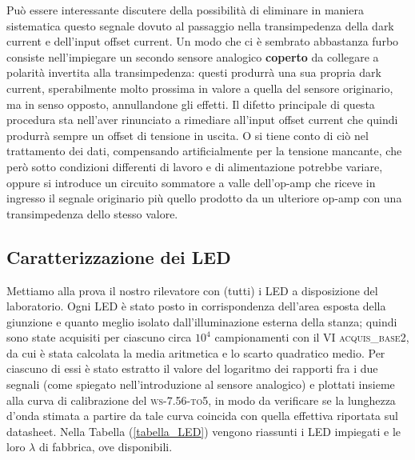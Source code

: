 \documentclass[10pt,letterpaper]{article}
\begin{document}
Può essere interessante discutere della possibilità di eliminare in maniera sistematica questo segnale dovuto al passaggio nella transimpedenza della dark current e dell'input offset current. Un modo che ci è sembrato abbastanza furbo consiste nell'impiegare un secondo sensore analogico \textbf{coperto} da collegare a polarità invertita alla transimpedenza: questi produrrà una sua propria dark current, sperabilmente molto prossima in valore a quella del sensore originario, ma in senso opposto, annullandone gli effetti. Il difetto principale di questa procedura sta nell'aver rinunciato a rimediare all'input offset current che quindi produrrà sempre un offset di tensione in uscita. O si tiene conto di ciò nel trattamento dei dati, compensando artificialmente per la tensione mancante, che però sotto condizioni differenti di lavoro e di alimentazione potrebbe variare, oppure si introduce un circuito sommatore a valle dell'op-amp che riceve in ingresso il segnale originario più quello prodotto da un ulteriore op-amp con una transimpedenza dello stesso valore.\\ 

\subsection{Caratterizzazione dei LED}
Mettiamo alla prova il nostro rilevatore con (tutti) i LED a disposizione del laboratorio. Ogni LED è stato posto in corrispondenza dell'area esposta della giunzione e quanto meglio isolato dall'illuminazione esterna della stanza; quindi sono state acquisiti per ciascuno circa $10^4$ campionamenti con il VI \textsc{acquis\_base2}, da cui è stata calcolata la media aritmetica e lo scarto quadratico medio. Per ciascuno di essi è stato estratto il valore del logaritmo dei rapporti fra i due segnali (come spiegato nell'introduzione al sensore analogico) e plottati insieme alla curva di calibrazione del \textsc{ws-7.56-to5}, in modo da verificare se la lunghezza d'onda stimata a partire da tale curva coincida con quella effettiva riportata sul datasheet. Nella Tabella (\ref{tabella_LED}) vengono riassunti i LED impiegati e le loro $\lambda$ di fabbrica, ove disponibili.
\end{document}
